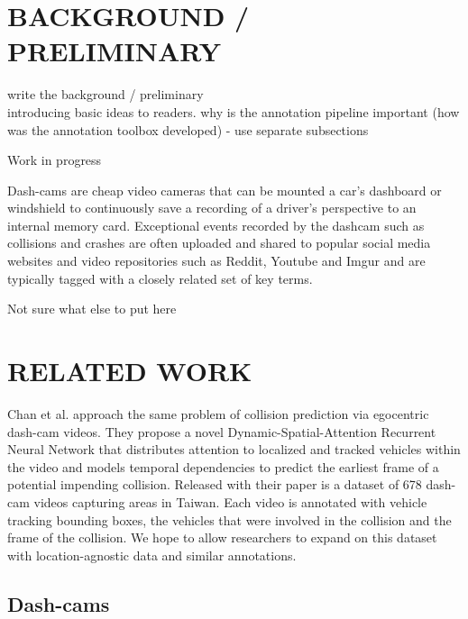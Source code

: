 \documentclass[letterpaper, 10 pt, conference]{IEEEconf}
\newcommand{\todo}[1]{{\color{red}#1}}
\begin{document}
\section{BACKGROUND / PRELIMINARY}
\todo{write the background / preliminary} \\
introducing basic ideas to readers. why is the annotation pipeline important (how was the annotation toolbox developed) - use separate subsections

\todo{Work in progress}

Dash-cams are cheap video cameras that can be mounted a car's dashboard or windshield to continuously save a recording of a driver's perspective to an internal memory card. Exceptional events recorded by the dashcam such as collisions and crashes are often uploaded and shared to popular social media websites and video repositories such as Reddit, Youtube and Imgur and are typically tagged with a closely related set of key terms.

\todo{Not sure what else to put here}



\section{RELATED WORK}

Chan et al. \cite{chan2016anticipating} approach the same problem of collision prediction via egocentric dash-cam videos. They propose a novel Dynamic-Spatial-Attention Recurrent Neural Network that distributes attention to localized and tracked vehicles within the video and models temporal dependencies to predict the earliest frame of a potential impending collision. Released with their paper is a dataset of 678 dash-cam videos capturing areas in Taiwan. Each video is annotated with vehicle tracking bounding boxes, the vehicles that were involved in the collision and the frame of the collision. We hope to allow researchers to expand on this dataset with location-agnostic data and similar annotations.



\subsection{Dash-cams}%
\label{sub:dash_cams}
\end{document}
